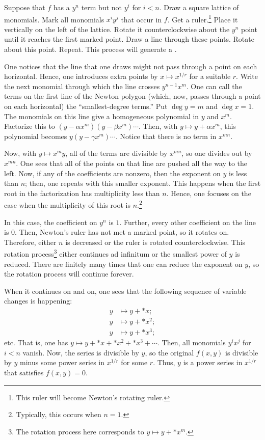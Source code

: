 \documentclass [11 pt, oneside] {article}
\begin{document}
\begin{esquisse}
	Suppose that $f$ has a $y^n$ term but not $y^i$ for $i<n$. Draw a square lattice of monomials. Mark all monomials $x^iy^j$ that occur in $f$. Get a ruler.\footnote{This ruler will become Newton's rotating ruler.} Place it vertically on the left of the lattice. Rotate it counterclockwise about the $y^n$ point until it reaches the first marked point. Draw a line through these points. Rotate about this point. Repeat. This process will generate a .

	One notices that the line that one draws might not pass through a point on each horizontal. Hence, one introduces extra points by $x\longmapsto x^{1/r}$ for a suitable $r$. Write the next monomial through which the line crosses $y^{n-1}x^m$. One can call the terms on the first line of the Newton polygon (which, now, passes through a point on each horizontal) the ``smallest-degree terms.'' Put $\deg y = m$ and $\deg x = 1$. The monomials on this line give a homogeneous polynomial in $y$ and $x^m$. Factorize this to $(y-\alpha x^m) (y-\beta x^m)\cdots$. Then, with $y\longmapsto y+\alpha x^m$, this polynomial becomes $y(y-\gamma x^m)\cdots$. Notice that there is no term in $x^{mn}$.

	Now, with $y\longmapsto x^my$, all of the terms are divisible by $x^{mn}$, so one divides out by $x^{mn}$. One sees that all of the points on that line are pushed all the way to the left. Now, if any of the coefficients are nonzero, then the exponent on $y$ is less than $n$; then, one repeats with this smaller exponent. This happens when the first root in the factorization has multiplicity less than $n$. Hence, one focuses on the case when the multiplicity of this root is $n$.\footnote{Typically, this occurs when $n=1$.}

	In this case, the coefficient on $y^n$ is $1$. Further, every other coefficient on the line is $0$. Then, Newton's ruler has not met a marked point, so it rotates on. Therefore, either $n$ is decreased or the ruler is rotated counterclockwise. This rotation process\footnote{The rotation process here corresponds to $y\longmapsto y + *x^m$.} either continues ad infinitum or the smallest power of $y$ is reduced. There are finitely many times that one can reduce the exponent on $y$, so the rotation process will continue forever.

	When it continues on and on, one sees that the following sequence of variable changes is happening:
	\begin{align*}
		y &\longmapsto y + *x;\\
		y &\longmapsto y + *x^2;\\
		y &\longmapsto y + *x^3;
	\end{align*}
	etc. That is, one has $y\longmapsto y + *x + *x^2 + *x^3 + \cdots$. Then, all monomials $y^ix^j$ for $i< n$ vanish. Now, the series is divisible by $y$, so the original $f(x,y)$ is divisible by $y$ minus some power series in $x^{1/r}$ for some $r$. Thus, $y$ is a power series in $x^{1/r}$ that satisfies $f(x,y)=0$.
\end{esquisse}
\end{document}

